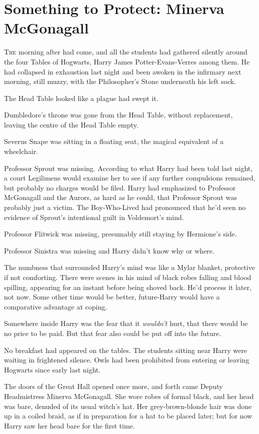\chapter{Something to Protect: Minerva McGonagall}

\lettrine{T}{he} morning after
had come, and all the students had gathered silently around the four Tables of
Hogwarts, Harry James Potter-Evans-Verres among them. He had collapsed in
exhaustion last night and been awoken in the infirmary next morning, still
muzzy, with the Philosopher's Stone underneath his left sock.

The Head Table looked like a plague had swept it.

Dumbledore's throne was gone from the Head Table, without replacement, leaving
the centre of the Head Table empty.

Severus Snape was sitting in a floating seat, the magical equivalent of a
wheelchair.

Professor Sprout was missing. According to what Harry had been told last night,
a court Legilimens would examine her to see if any further compulsions
remained, but probably no charges would be filed. Harry had emphasized to
Professor McGonagall and the Aurors, as hard as he could, that Professor Sprout
was probably just a victim. The Boy-Who-Lived had pronounced that he'd seen no
evidence of Sprout's intentional guilt in Voldemort's mind.

Professor Flitwick was missing, presumably still staying by Hermione's side.

Professor Sinistra was missing and Harry didn't know why or where.

The numbness that surrounded Harry's mind was like a Mylar blanket, protective
if not comforting. There were scenes in his mind of black robes falling and
blood spilling, appearing for an instant before being shoved back. He'd process
it later, not now. Some other time would be better, future-Harry would have a
comparative advantage at coping.

Somewhere inside Harry was the fear that it \emph{wouldn't} hurt, that there
would be no price to be paid. But that fear also could be put off into the
future.

No breakfast had appeared on the tables. The students sitting near Harry were
waiting in frightened silence. Owls had been prohibited from entering or
leaving Hogwarts since early last night.

The doors of the Great Hall opened once more, and forth came Deputy
Headmistress Minerva McGonagall. She wore robes of formal black, and her head
was bare, denuded of its usual witch's hat. Her grey-brown-blonde hair was done
up in a coiled braid, as if in preparation for a hat to be placed later; but
for now Harry saw her head bare for the first time.

